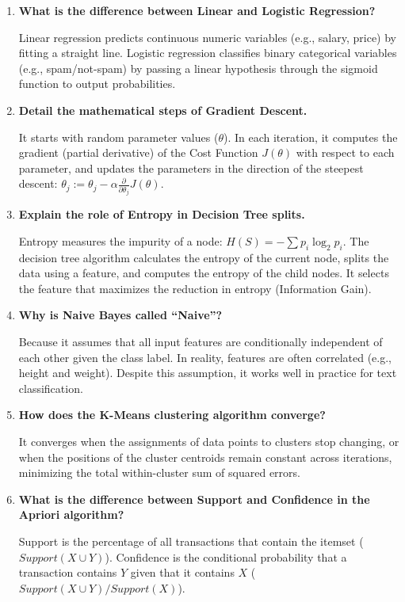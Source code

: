 \documentclass[12pt,a4paper]{article}
\newcommand{\Q}[1]{\textbf{#1}\par\noindent\ignorespaces}
\begin{document}
\begin{tcolorbox}[exambox, title={\textbf{Frequently Asked / Viva Questions}}]
\begin{enumerate}[leftmargin=*, topsep=0pt, label=\textbf{Q\arabic*.}, itemsep=5pt]
  \item \Q{What is the difference between Linear and Logistic Regression?}
        Linear regression predicts continuous numeric variables (e.g., salary, price) by fitting a straight line. Logistic regression classifies binary categorical variables (e.g., spam/not-spam) by passing a linear hypothesis through the sigmoid function to output probabilities.
        
  \item \Q{Detail the mathematical steps of Gradient Descent.}
        It starts with random parameter values ($\theta$). In each iteration, it computes the gradient (partial derivative) of the Cost Function $J(\theta)$ with respect to each parameter, and updates the parameters in the direction of the steepest descent: $\theta_j := \theta_j - \alpha \frac{\partial}{\partial \theta_j} J(\theta)$.
        
  \item \Q{Explain the role of Entropy in Decision Tree splits.}
        Entropy measures the impurity of a node: $H(S) = -\sum p_i \log_2 p_i$. The decision tree algorithm calculates the entropy of the current node, splits the data using a feature, and computes the entropy of the child nodes. It selects the feature that maximizes the reduction in entropy (Information Gain).
        
  \item \Q{Why is Naive Bayes called ``Naive''?}
        Because it assumes that all input features are conditionally independent of each other given the class label. In reality, features are often correlated (e.g., height and weight). Despite this assumption, it works well in practice for text classification.
        
  \item \Q{How does the K-Means clustering algorithm converge?}
        It converges when the assignments of data points to clusters stop changing, or when the positions of the cluster centroids remain constant across iterations, minimizing the total within-cluster sum of squared errors.
        
  \item \Q{What is the difference between Support and Confidence in the Apriori algorithm?}
        Support is the percentage of all transactions that contain the itemset ($Support(X \cup Y)$). Confidence is the conditional probability that a transaction contains $Y$ given that it contains $X$ ($Support(X \cup Y) / Support(X)$).
        

\end{enumerate}
\end{tcolorbox}
\end{document}
